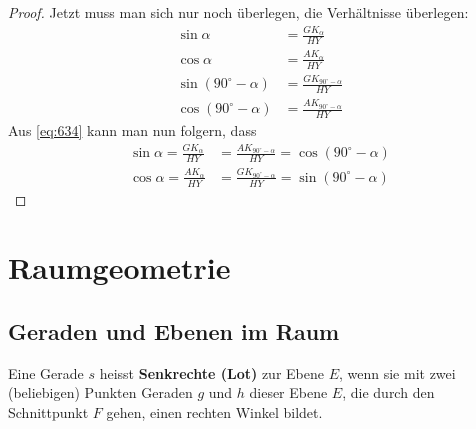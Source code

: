\documentclass{report}
\theoremstyle{definition}
\theoremstyle{definition}
\theoremstyle{an}
\theoremstyle{lem}
\theoremstyle{def}
\theoremstyle{def}
\begin{document}
\begin{proof}
Jetzt muss man sich nur noch überlegen, die Verhältnisse überlegen:
\begin{align}
    \sin \alpha &= \frac{GK_\alpha}{HY} \\ 
    \cos \alpha &= \frac{AK_\alpha}{HY} \\
    \sin(90^\circ - \alpha) &= \frac{GK_{90^\circ - \alpha}}{HY} \\
    \cos(90^\circ - \alpha) &= \frac{AK_{90^\circ - \alpha}}{HY}
\end{align}
Aus \eqref{eq:634} kann man nun folgern, dass 
\begin{align}
    \sin \alpha = \frac{GK_\alpha}{HY} &= \frac{AK_{90^\circ - \alpha}}{HY} = \cos(90^\circ - \alpha) \\
    \cos \alpha = \frac{AK_\alpha}{HY} &= \frac{GK_{90^\circ - \alpha}}{HY} = \sin(90^\circ - \alpha)
\end{align}
\end{proof}

\chapter{Raumgeometrie}
\section{Geraden und Ebenen im Raum}

\begin{defi}[Lot]
Eine Gerade $s$ heisst \textbf{Senkrechte (Lot)} zur Ebene $E$, wenn sie mit zwei (beliebigen) Punkten Geraden $g$ und $h$ dieser Ebene $E$, die durch den Schnittpunkt $F$ gehen, einen rechten Winkel bildet.
\end{defi}
\end{document}
